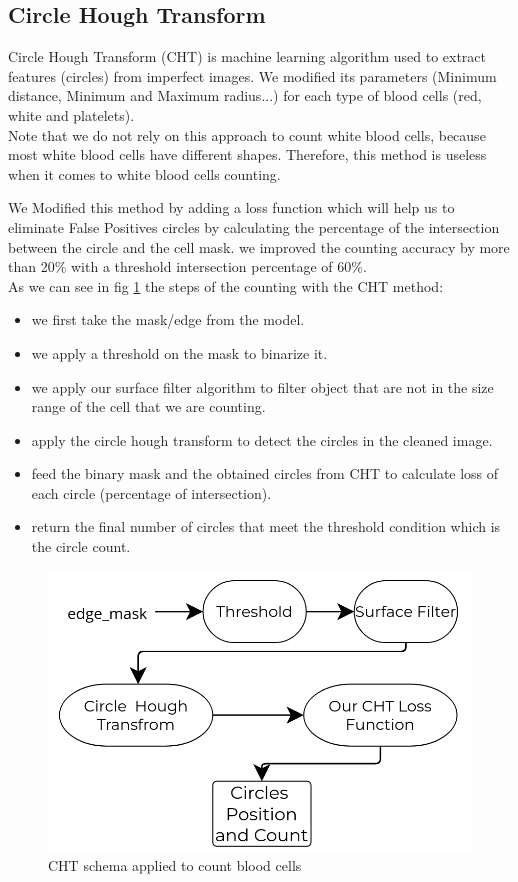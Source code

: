 \subsection{Circle Hough Transform}
\hspace{\parindent}
Circle Hough Transform (CHT) is machine learning algorithm used to extract features (circles) from imperfect images.
We modified its parameters (Minimum distance, Minimum and Maximum radius...) for each type of blood cells (red, white and platelets).\\
Note that we do not rely on this approach to count white blood cells, because most white blood cells have different shapes.
Therefore, this method is useless when it comes to white blood cells counting.

We Modified this method by adding a loss function which will help us to eliminate False Positives circles by calculating the percentage of the intersection between the circle and the cell mask. we improved the counting accuracy by more than 20\% with a threshold intersection percentage of 60\%.\\
As we can see in fig \ref{fig:cht_scheme} the steps of the counting with the CHT method:
\begin{itemize}
    \item we first take the mask/edge from the model.
    \item we apply a threshold on the mask to binarize it.
    \item we apply our surface filter algorithm to filter object that are not in the size range of the cell that we are counting.
    \item apply the circle hough transform to detect the circles in the cleaned image.
    \item feed the binary mask and the obtained circles from CHT to calculate loss of each circle (percentage of intersection).
    \item return the final number of circles that meet the threshold condition which is the circle count.

  \end{itemize} 
\begin{figure}[H]
\centering
  \vspace{-0.1in}
    \centerline{\includegraphics[width = 7in]{../images/CHT_scheme.png}}
    \caption{CHT schema applied to count blood cells}
    \label{fig:cht_scheme}
\end{figure}

